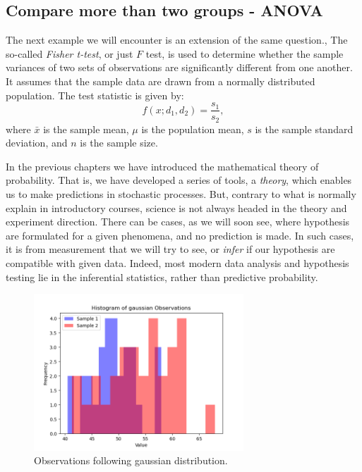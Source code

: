 \documentclass{book}
\begin{document}
\newpage
\subsection{Compare more than two groups - ANOVA}

The next example we will encounter is an extension of the same question., The so-called \textit{Fisher t-test}, or just $F$ test, is used to determine whether the sample variances of two sets of observations are significantly different from one another. It assumes that the sample data are drawn from a normally distributed population. The test statistic is given by:
\[
    f(x; d_{1}, d_{2}) = \frac{s_1}{s_2},
\]
where $\bar{x}$ is the sample mean, $\mu$ is the population mean, $s$ is the sample standard deviation, and $n$ is the sample size.

In the previous chapters we have introduced the mathematical theory of probability. That is, we have developed a series of tools, a \textit{theory}, which enables us to make predictions in stochastic processes. But, contrary to what is normally explain in introductory courses, science is not always headed in the theory and experiment direction. There can be cases, as we will soon see, where hypothesis are formulated for a given phenomena, and no prediction is made. In such cases, it is from measurement that we will try to see, or \textit{infer} if our hypothesis are compatible with given data. Indeed, most modern data analysis and hypothesis testing lie in the inferential statistics, rather than predictive probability.

\begin{figure}[ht]
    \centering
    \includegraphics[width=0.7\textwidth]{figures/chapter4/f_observations.png}
    \caption{Observations following gaussian distribution.}
    \label{fig:f_obs}
\end{figure}
\end{document}
